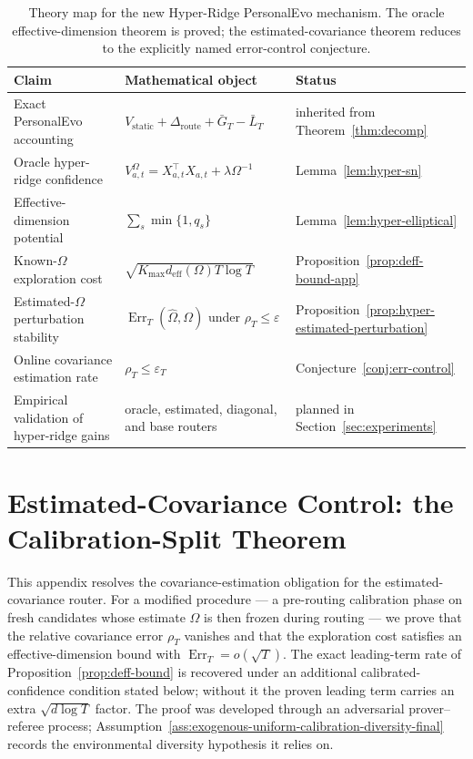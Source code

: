 \documentclass{article} %
\begin{document}
\begin{table}[h]
\centering
\small
\begin{tabular}{lll}
\toprule
Claim & Mathematical object & Status \\
\midrule
Exact PersonalEvo accounting & \(V_{\mathrm{static}}+\Delta_{\mathrm{route}}+\bar G_T-\bar L_T\) & inherited from Theorem~\ref{thm:decomp} \\
Oracle hyper-ridge confidence & \(V_{a,t}^{\Omega}=X_{a,t}^{\top}X_{a,t}+\lambda\Omega^{-1}\) & Lemma~\ref{lem:hyper-sn} \\
Effective-dimension potential & \(\sum_s \min\{1,q_s\}\) & Lemma~\ref{lem:hyper-elliptical} \\
Known-\(\Omega\) exploration cost & \(\sqrt{K_{\max}d_{\mathrm{eff}}(\Omega)T\log T}\) & Proposition~\ref{prop:deff-bound-app} \\
Estimated-\(\Omega\) perturbation stability & \(\operatorname{Err}_T(\widehat{\Omega},\Omega)\) under \(\rho_T\le\varepsilon\) & Proposition~\ref{prop:hyper-estimated-perturbation} \\
Online covariance estimation rate & \(\rho_T\le\varepsilon_T\) & Conjecture~\ref{conj:err-control} \\
Empirical validation of hyper-ridge gains & oracle, estimated, diagonal, and base routers & planned in Section~\ref{sec:experiments} \\
\bottomrule
\end{tabular}
\caption{Theory map for the new Hyper-Ridge PersonalEvo mechanism.  The oracle effective-dimension theorem is proved; the estimated-covariance theorem reduces to the explicitly named error-control conjecture.}
\label{tab:hyper-theory-map}
\end{table}

\section{Estimated-Covariance Control: the Calibration-Split Theorem}
\label{app:err-control-proof}

This appendix resolves the covariance-estimation obligation for the estimated-covariance router. For a modified procedure — a pre-routing calibration phase on fresh candidates whose estimate $\widehat{\Omega}$ is then frozen during routing — we prove that the relative covariance error $\rho_T$ vanishes and that the exploration cost satisfies an effective-dimension bound with $\operatorname{Err}_T = o(\sqrt{T})$. The exact leading-term rate of Proposition~\ref{prop:deff-bound} is recovered under an additional calibrated-confidence condition stated below; without it the proven leading term carries an extra $\sqrt{d\log T}$ factor. The proof was developed through an adversarial prover--referee process; Assumption~\ref{ass:exogenous-uniform-calibration-diversity-final} records the environmental diversity hypothesis it relies on.
\end{document}
